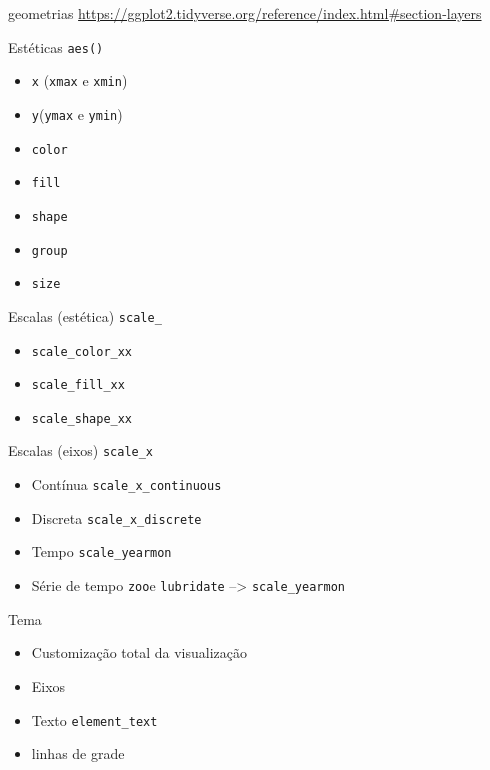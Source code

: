 \documentclass[
  9pt,
  ignorenonframetext,
]{beamer}
\begin{document}
\begin{frame}{geometrias}
\protect\hypertarget{geometrias}{}
\url{https://ggplot2.tidyverse.org/reference/index.html\#section-layers}
\end{frame}

\begin{frame}[fragile]{Estéticas \texttt{aes()}}
\protect\hypertarget{estuxe9ticas-aes}{}
\begin{itemize}
\item
  \texttt{x} (\texttt{xmax} e \texttt{xmin})
\item
  \texttt{y}(\texttt{ymax} e \texttt{ymin})
\item
  \texttt{color}
\item
  \texttt{fill}
\item
  \texttt{shape}
\item
  \texttt{group}
\item
  \texttt{size}
\end{itemize}
\end{frame}

\begin{frame}[fragile]{Escalas (estética) \texttt{scale\_}}
\protect\hypertarget{escalas-estuxe9tica-scale_}{}
\begin{itemize}
\item
  \texttt{scale\_color\_xx}
\item
  \texttt{scale\_fill\_xx}
\item
  \texttt{scale\_shape\_xx}
\end{itemize}
\end{frame}

\begin{frame}[fragile]{Escalas (eixos) \texttt{scale\_x}}
\protect\hypertarget{escalas-eixos-scale_x}{}
\begin{itemize}
\item
  Contínua \texttt{scale\_x\_continuous}
\item
  Discreta \texttt{scale\_x\_discrete}
\item
  Tempo \texttt{scale\_yearmon}
\item
  Série de tempo \texttt{zoo}e \texttt{lubridate} --\textgreater{}
  \texttt{scale\_yearmon}
\end{itemize}
\end{frame}

\begin{frame}[fragile]{Tema}
\protect\hypertarget{tema}{}
\begin{itemize}
\item
  Customização total da visualização
\item
  Eixos
\item
  Texto \texttt{element\_text}
\item
  linhas de grade
\end{itemize}
\end{frame}
\end{document}
